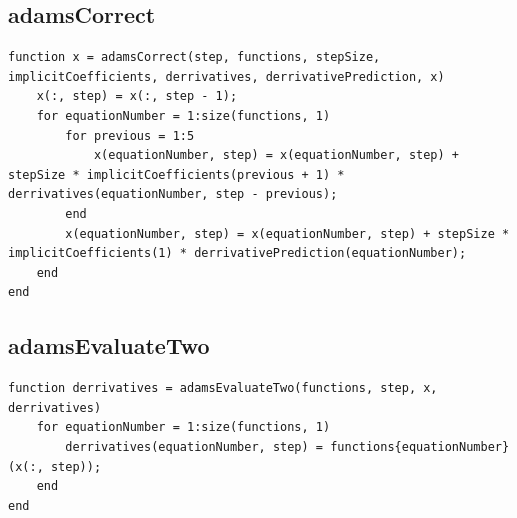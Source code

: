 \subsection{adamsCorrect}
\begin{simplechar}
\begin{lstlisting}
function x = adamsCorrect(step, functions, stepSize, implicitCoefficients, derrivatives, derrivativePrediction, x)
    x(:, step) = x(:, step - 1);
    for equationNumber = 1:size(functions, 1)
        for previous = 1:5
            x(equationNumber, step) = x(equationNumber, step) + stepSize * implicitCoefficients(previous + 1) * derrivatives(equationNumber, step - previous);
        end
        x(equationNumber, step) = x(equationNumber, step) + stepSize * implicitCoefficients(1) * derrivativePrediction(equationNumber);
    end
end
\end{lstlisting}
\end{simplechar}

\subsection{adamsEvaluateTwo}
\begin{simplechar}
\begin{lstlisting}
function derrivatives = adamsEvaluateTwo(functions, step, x, derrivatives)
    for equationNumber = 1:size(functions, 1)
        derrivatives(equationNumber, step) = functions{equationNumber}(x(:, step));
    end
end
\end{lstlisting}
\end{simplechar}

